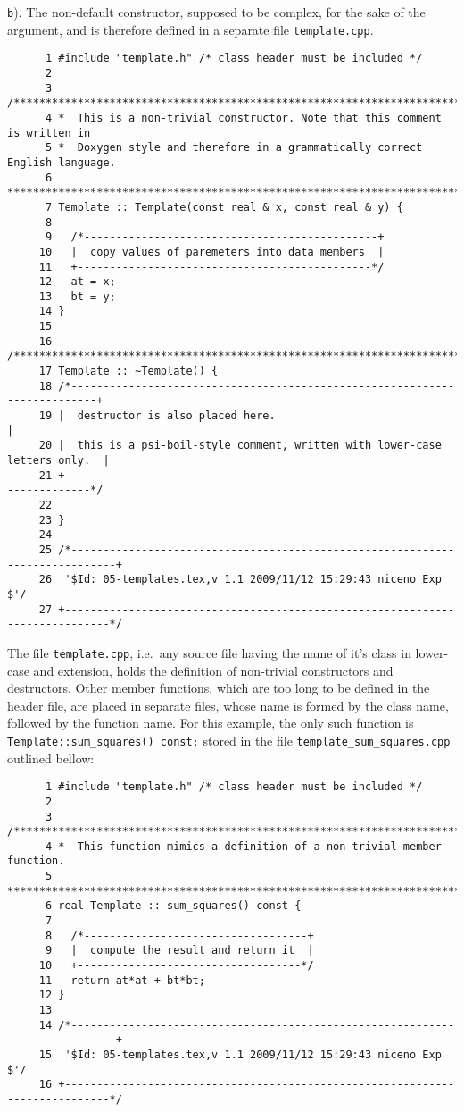{\tt b}). The non-default constructor, supposed to be complex, for the sake of the
argument, and is therefore defined in a separate file {\tt template.cpp}.
%
{\small \begin{verbatim}
      1 #include "template.h" /* class header must be included */
      2
      3 /***************************************************************************//**
      4 *  This is a non-trivial constructor. Note that this comment is written in
      5 *  Doxygen style and therefore in a grammatically correct English language.
      6 *******************************************************************************/
      7 Template :: Template(const real & x, const real & y) {
      8
      9   /*----------------------------------------------+
     10   |  copy values of paremeters into data members  |
     11   +----------------------------------------------*/
     12   at = x;
     13   bt = y;
     14 }
     15
     16 /******************************************************************************/
     17 Template :: ~Template() {
     18 /*--------------------------------------------------------------------------+
     19 |  destructor is also placed here.                                          |
     20 |  this is a psi-boil-style comment, written with lower-case letters only.  |
     21 +--------------------------------------------------------------------------*/
     22
     23 }
     24
     25 /*-----------------------------------------------------------------------------+
     26  '$Id: 05-templates.tex,v 1.1 2009/11/12 15:29:43 niceno Exp $'/
     27 +-----------------------------------------------------------------------------*/
\end{verbatim}}
% 
The file {\tt template.cpp}, i.e.\ any source file having the name of it's class
in lower-case and extension, holds the definition of non-trivial constructors and
destructors. 
% 
Other member functions, which are too long to be defined in the header file, are
placed in separate files, whose name is formed by the class name, followed by 
the function name. For this example, the only such function is 
{\tt Template::sum\_squares() const;} stored in the file 
{\tt template\_sum\_squares.cpp} outlined bellow:
%
{\small \begin{verbatim}
      1 #include "template.h" /* class header must be included */
      2
      3 /***************************************************************************//**
      4 *  This function mimics a definition of a non-trivial member function.
      5 *******************************************************************************/
      6 real Template :: sum_squares() const {
      7
      8   /*-----------------------------------+
      9   |  compute the result and return it  |
     10   +-----------------------------------*/
     11   return at*at + bt*bt;
     12 }
     13
     14 /*-----------------------------------------------------------------------------+
     15  '$Id: 05-templates.tex,v 1.1 2009/11/12 15:29:43 niceno Exp $'/
     16 +-----------------------------------------------------------------------------*/
\end{verbatim}}
% 

